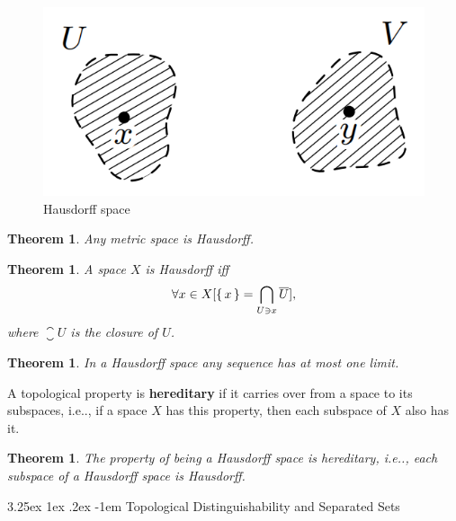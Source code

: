 \documentclass[12pt, letterpaper]{article}
\makeatletter
\newcommand\ie{i.e\@ifnextchar.{}{.\@}}
\newtheorem{thm}[prop]{Theorem}
\renewcommand\paragraph{\@startsection{paragraph}{4}{\z@}%
	{3.25ex \@plus1ex \@minus.2ex}%
	{-1em}%
	{\normalfont\normalsize\bfseries}}
\theoremstyle{definition}
\theoremstyle{remark}
\theoremstyle{definition}
\theoremstyle{plain}
\numberwithin{equation}{section}
\makeatother
\begin{document}
	\begin{figure}[H]
		\centering
		\includegraphics[scale=0.5]{HausdorffAxiom}
		\caption[Hausdorff space]{Hausdorff space}
		\label{fig:hausdorffaxiom}
	\end{figure}
	\begin{thm}
		Any metric space is Hausdorff.
	\end{thm}
	\begin{thm}
		A space $X$ is Hausdorff iff 
		\[\forall x\in X [\set{x}=\bigcap_{U\ni x}\closure{U}],\]
		where $\closure{U}$ is the closure of $U$.
	\end{thm}
	\begin{thm}
		In a Hausdorff space any sequence has at most one limit.
	\end{thm}
	\begin{def*}
		A topological property is \textbf{hereditary}
		if it carries over from a space to its
		subspaces, \ie, if a space $X$ has this property,
		then each subspace of $X$ also
		has it.
	\end{def*}
	\begin{thm}
		The property of being a Hausdorff space is hereditary,
		\ie, each subspace of a Hausdorff space is Hausdorff.
	\end{thm}
	\paragraph{Topological Distinguishability and Separated Sets}
	
\end{document}
